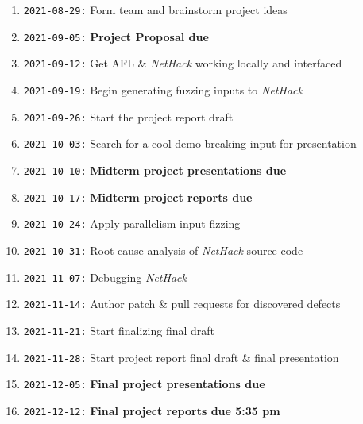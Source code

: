 \documentclass[12pt]{diazessay}
\begin{document}
  \begin{enumerate}[label={}]
  	\item \texttt{2021-08-29:} Form team and brainstorm project ideas
  	\item \texttt{2021-09-05:} \textbf{Project Proposal due}
  	\item \texttt{2021-09-12:} Get AFL \& \emph{NetHack} working locally and interfaced
 	\item \texttt{2021-09-19:} Begin generating fuzzing inputs to \emph{NetHack}
  	\item \texttt{2021-09-26:} Start the project report draft
  	\item \texttt{2021-10-03:} Search for a cool demo breaking input for presentation
  	\item \texttt{2021-10-10:} \textbf{Midterm project presentations due}
  	\item \texttt{2021-10-17:} \textbf{Midterm project reports due}
  	\item \texttt{2021-10-24:} Apply parallelism input fizzing
  	\item \texttt{2021-10-31:} Root cause analysis of \emph{NetHack} source code
  	\item \texttt{2021-11-07:} Debugging \emph{NetHack}
  	\item \texttt{2021-11-14:} Author patch \& pull requests for discovered defects
  	\item \texttt{2021-11-21:} Start finalizing final draft
  	\item \texttt{2021-11-28:} Start project report final draft \& final presentation
  	\item \texttt{2021-12-05:} \textbf{Final project presentations due}
  	\item \texttt{2021-12-12:} \textbf{Final project reports due 5:35 pm}
  \end{enumerate}


\clearpage



\end{document}
